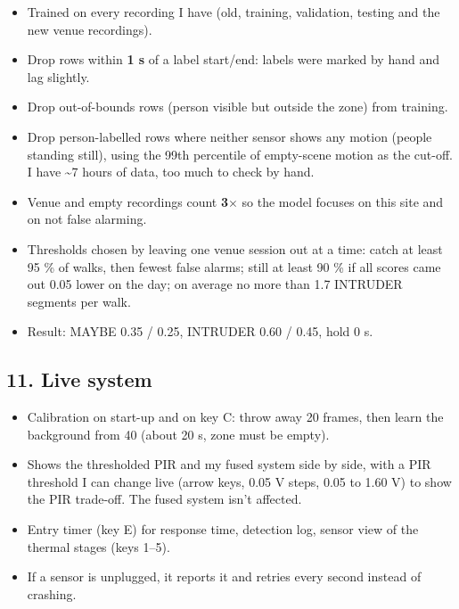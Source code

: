 \documentclass[11pt,a4paper]{article}
\providecommand{\tightlist}{\setlength{\itemsep}{0pt}\setlength{\parskip}{0pt}}
\begin{document}
\begin{itemize}
\tightlist
\item
  Trained on every recording I
  have (old, training,
  validation, testing and the
  new venue recordings).
\item
  Drop rows within \textbf{1
  s} of a label start/end:
  labels were marked by hand
  and lag slightly.
\item
  Drop out-of-bounds rows
  (person visible but outside
  the zone) from training.
\item
  Drop person-labelled rows
  where neither sensor shows
  any motion (people standing
  still), using the 99th
  percentile of empty-scene
  motion as the cut-off. I
  have \textasciitilde7 hours
  of data, too much to check
  by hand.
\item
  Venue and empty recordings
  count \textbf{3$\times$} so the
  model focuses on this site
  and on not false alarming.
\item
  Thresholds chosen by leaving
  one venue session out at a
  time: catch at least 95 \%
  of walks, then fewest false
  alarms; still at least 90 \%
  if all scores came out 0.05
  lower on the day; on average
  no more than 1.7 INTRUDER
  segments per walk.
\item
  Result: MAYBE 0.35 / 0.25,
  INTRUDER 0.60 / 0.45, hold 0
  s.
\end{itemize}

\hypertarget{live-system}{%
\subsection{11. Live
system}\label{live-system}}

\begin{itemize}
\tightlist
\item
  Calibration on start-up and
  on key C: throw away 20
  frames, then learn the
  background from 40 (about 20
  s, zone must be empty).
\item
  Shows the thresholded PIR
  and my fused system side by
  side, with a PIR threshold I
  can change live (arrow keys,
  0.05 V steps, 0.05 to 1.60
  V) to show the PIR
  trade-off. The fused system
  isn't affected.
\item
  Entry timer (key E) for
  response time, detection
  log, sensor view of the
  thermal stages (keys 1--5).
\item
  If a sensor is unplugged, it
  reports it and retries every
  second instead of crashing.
\end{itemize}
\end{document}
